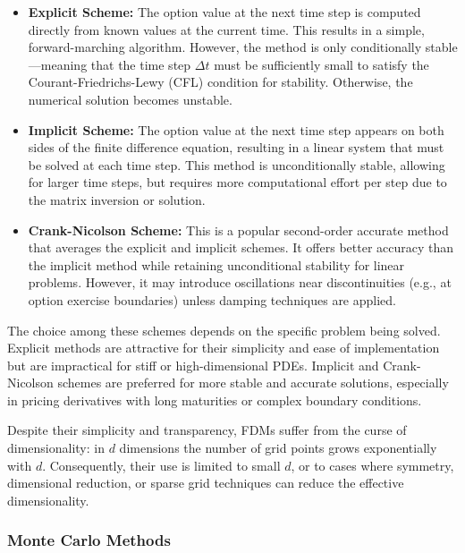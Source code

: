 \documentclass[12pt]{report} %
\theoremstyle{plain} %
\theoremstyle{definition} %
\theoremstyle{remark} %
\begin{document}
\begin{itemize}
    \item \textbf{Explicit Scheme:} The option value at the next 
	time step is computed directly from known values at the current time. 
	This results in a simple, forward-marching algorithm. However, 
	the method is only conditionally stable—meaning that the time 
	step \(\Delta t\) must be sufficiently small to satisfy the 
	Courant-Friedrichs-Lewy (CFL) condition for stability. Otherwise, 
	the numerical solution becomes unstable.

    \item \textbf{Implicit Scheme:} The option value at the next time 
	step appears on both sides of the finite difference equation, 
	resulting in a linear system that must be solved at each time step. 
	This method is unconditionally stable, allowing for larger time steps, 
	but requires more computational effort per step due to the matrix 
	inversion or solution.

    \item \textbf{Crank-Nicolson Scheme:} This is a popular second-order 
	accurate method that averages the explicit and implicit schemes. It offers 
	better accuracy than the implicit method while retaining unconditional 
	stability for linear problems. However, it may introduce oscillations near 
	discontinuities (e.g., at option exercise boundaries) unless damping 
	techniques are applied.
\end{itemize}

The choice among these schemes depends on the specific problem being solved. 
Explicit methods are attractive for their simplicity and ease of implementation 
but are impractical for stiff or high-dimensional PDEs. Implicit and Crank-Nicolson 
schemes are preferred for more stable and accurate solutions, especially 
in pricing derivatives with long maturities or complex boundary conditions.

Despite their simplicity and transparency, FDMs suffer from the curse of 
dimensionality: in \(d\) dimensions the number of grid points grows exponentially 
with \(d\). Consequently, their use is limited to small \(d\), or to cases where 
symmetry, dimensional reduction, or sparse grid techniques can reduce the effective 
dimensionality.

\subsubsection{Monte Carlo Methods}
\end{document}
